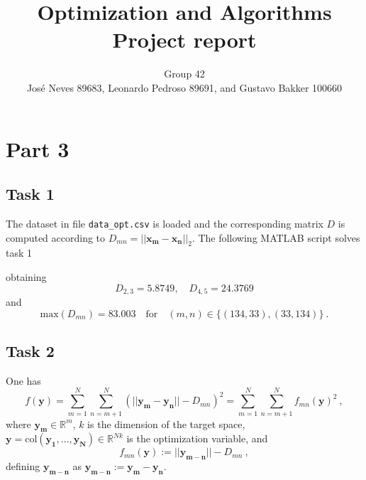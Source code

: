 \documentclass[12pt]{article}
\title{Optimization and Algorithms \\ Project report}
\author{Group 42 \\ Jos{\'e} Neves 89683, Leonardo Pedroso 89691, and Gustavo Bakker 100660}
\date{}
\begin{document}
\maketitle


\section{Part 3}
\subsection{Task 1}
The dataset in file \verb|data_opt.csv| is loaded and the corresponding matrix $D$ is computed according to $D_{mn} = ||\mathbf{x_m}-\mathbf{x_n}||_2$. The following MATLAB script solves task 1

obtaining 
\begin{equation*}\label{key}
D_{2,3} = 5.8749, \quad D_{4,5} = 24.3769
\end{equation*} 
and 
\begin{equation*}\label{key}
\mathrm{max}(D_{mn}) = 83.003 \quad \text{for} \quad (m,n) \in \{(134,33),(33,134)\}\:.
\end{equation*}

\subsection{Task 2}
One has 
\begin{equation}\label{eq:deff}
f(\mathbf{y}) = \sum_{m=1}^{N}\sum_{n=m+1}^{N}(||\mathbf{y_m}-\mathbf{y_n}||-D_{mn})^2 = \sum_{m=1}^{N}\sum_{n=m+1}^{N} f_{mn}(\mathbf{y})^2 \:,
\end{equation}
where $\mathbf{y_m}\in \mathbb{R}^m$, $k$ is the dimension of the target space, $\mathbf{y} = \mathrm{col}(\mathbf{y_1},\ldots,\mathbf{y_N}) \in \mathbb{R}^{Nk}$ is the optimization variable, and 
\begin{equation}\label{eq:deffmn}
f_{mn}(\mathbf{y}) := ||\mathbf{y_{m-n}}||-D_{mn}\:,
\end{equation}
defining $\mathbf{y_{m-n}}$ as $\mathbf{y_{m-n}}:=\mathbf{y_m}-\mathbf{y_n}$. 
\end{document}
